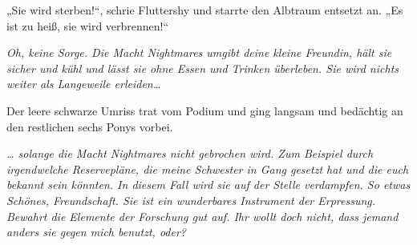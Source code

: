 „Sie wird sterben!“, schrie Fluttershy und starrte den Albtraum entsetzt an. „Es ist zu heiß, sie wird verbrennen!“

\emph{\emph{Oh, keine Sorge. Die Macht} \emph{Nightmares} \emph{umgibt deine kleine Freundin, hält sie sicher und kühl und lässt sie ohne Essen und Trinken überleben. Sie wird nichts weiter als Langeweile erleiden…}}

Der leere schwarze Umriss trat vom Podium und ging langsam und bedächtig an den restlichen sechs Ponys vorbei.

\emph{\emph{… solange die Macht} \emph{Nightmares} \emph{nicht gebrochen wird. Zum Beispiel durch irgendwelche Reservepläne, die meine Schwester in Gang gesetzt hat und die euch bekannt sein könnten. In diesem Fall wird sie auf der Stelle verdampfen. So etwas Schönes, Freundschaft. Sie ist ein wunderbares Instrument der Erpressung. Bewahrt die Elemente der Forschung gut auf. Ihr wollt doch nicht, dass jemand anders sie gegen mich benutzt, oder?}}

